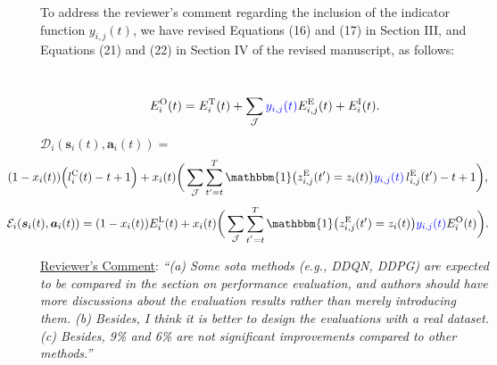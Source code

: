\documentclass[12pt,draftclsnofoot,onecolumn]{IEEEtran}
\newcommand{\rev}[1]{{\color{blue}#1}} %
\newcommand{\rev}[1]{#1}
\newenvironment{my}[2]%
{\begin{list}{}%
{\setlength{\rightmargin}{#1}\setlength{\leftmargin}{#2}}%


 \item[]{}

} {\end{list}}
\begin{document}
\begin{enumerate}
To address the reviewer’s comment regarding the inclusion of the indicator function $y_{i,j}(t)$, we have revised Equations (16) and (17) in Section III, and Equations (21) and (22) in Section IV of the revised manuscript, as follows:
\setcounter{equation}{16}
		\begin{my}{1cm}{1cm}
	\rev{
		{\ \color{black}
\begin{alignat}{1}
	E_i^{\text{O}}(t) = E_i^{\text{T}}(t) + \sum_{\mathcal{J}} \textcolor{blue}{y_{i,j}(t)} E_{i,j}^{\text{E}}(t) + E_i^{\text{I}}(t).
	\label{17}
\end{alignat}
\setcounter{equation}{20}
	\hspace{-10mm}$\mathcal{D}_i(\boldsymbol{s}_i(t),\boldsymbol{a}_i(t)) =$
\begin{alignat}{1}
 \hspace{-10mm}(1-x_i(t))\Big(l_i^{\text{C}}(t) - t + 1\Big)  +  x_i(t)\bigg( \sum\limits_{\mathcal{J}} \sum\limits_{t'=t}^{T} \mathbbm{1}\big(z_{i,j}^{\text{E}}(t') = z_i(t)\big) \textcolor{blue}{y_{i,j}(t)} \, l_{i,j}^{\text{E}}(t') - t +1\bigg),
	\label{21}  
\end{alignat} 
\begin{alignat}{1}
	\hspace{-10mm}\mathcal{E}_i(\boldsymbol{s}_i(t),\boldsymbol{a}_i(t)) = (1-x_i(t)) E_i^{\text{L}}(t)+  x_i(t)\bigg( \sum\limits_{\mathcal{J}} \sum\limits_{t^{'}=t}^{T}\mathbbm{1}\big(z_{i,j}^{\text{E}}(t') = z_i(t)\big) \textcolor{blue}{y_{i,j}(t)}  E_i^{\text{O}}(t)  \bigg).
	\label{22}  
\end{alignat}
}}
\end{my}




\item \underline{Reviewer's Comment}: 
\textit{``(a) Some sota methods (e.g., DDQN, DDPG) are expected to be compared in the section on performance evaluation, and authors should have more discussions about the evaluation results rather than merely introducing them.  (b) Besides, I think it is better to design the evaluations with a real dataset. (c) Besides, 9\% and 6\% are not significant improvements compared to other methods.''}\newline



\end{enumerate}
\end{document}
